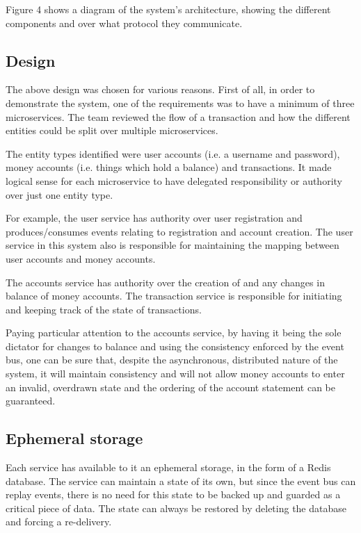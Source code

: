 \documentclass{l3proj}
\begin{document}
Figure 4 shows a diagram of the system's architecture, showing the different components and over what protocol they communicate.



\subsection{Design}
The above design was chosen for various reasons. First of all, in order to demonstrate the system, one of the requirements was to have a minimum of three microservices. The team reviewed the flow of a transaction and how the different entities could be split over multiple microservices.

The entity types identified were user accounts (i.e. a username and password), money accounts (i.e. things which hold a balance) and transactions. It made logical sense for each microservice to have delegated responsibility or authority over just one entity type.

For example, the user service has authority over user registration and produces/consumes events relating to registration and account creation. The user service in this system also is responsible for maintaining the mapping between user accounts and money accounts.

The accounts service has authority over the creation of and any changes in balance of money accounts. The transaction service is responsible for initiating and keeping track of the state of transactions.

Paying particular attention to the accounts service, by having it being the sole dictator for changes to balance and using the consistency enforced by the event bus, one can be sure that, despite the asynchronous, distributed nature of the system, it will maintain consistency and will not allow money accounts to enter an invalid, overdrawn state and the ordering of the account statement can be guaranteed.

\subsection{Ephemeral storage}
Each service has available to it an ephemeral storage, in the form of a Redis database. The service can maintain a state of its own, but since the event bus can replay events, there is no need for this state to be backed up and guarded as a critical piece of data. The state can always be restored by deleting the database and forcing a re-delivery.
\end{document}
